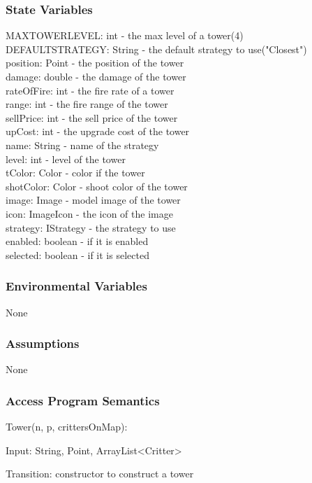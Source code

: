 \documentclass[12,english]{article}
\begin{document}
		\subsubsection{State Variables}
		MAXTOWERLEVEL: int - the max level of a tower(4)\\
		DEFAULTSTRATEGY: String - the default strategy to use("Closest")\\
		position: Point - the position of the tower\\
		damage: double - the damage of the tower\\
    	rateOfFire: int - the fire rate of a tower\\
	    range: int - the fire range of the tower\\
	    sellPrice: int - the sell price of the tower\\	
	    upCost: int - the upgrade cost of the tower\\
	    name: String - name of the strategy\\
	    level: int - level of the tower\\
	    tColor: Color - color if the tower\\
	    shotColor: Color - shoot color of the tower\\
	    image: Image - model image of the tower\\
        icon: ImageIcon - the icon of the image\\
        strategy: IStrategy - the strategy to use\\ 
        enabled: boolean - if it is enabled\\
        selected: boolean - if it is selected\\
		\subsubsection{Environmental Variables}
		None
		\subsubsection{Assumptions}
        None

		\subsubsection{Access Program Semantics}
		Tower(n, p, crittersOnMap):
		
		Input: String, Point, ArrayList<Critter>
		
		Transition: constructor to construct a tower
		
\end{document}
